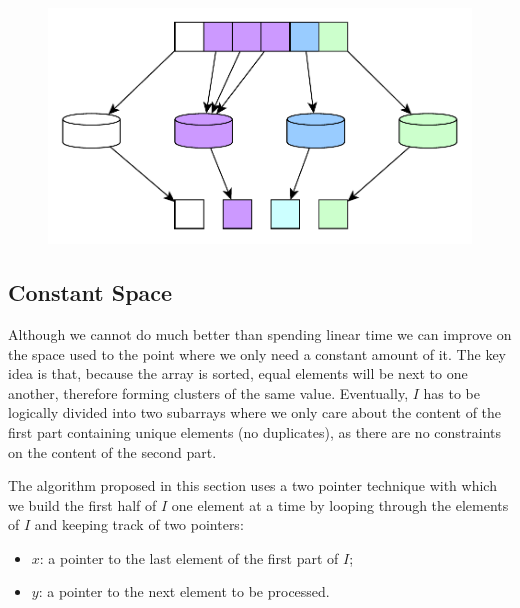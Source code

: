 \begin{figure} 
	\centering
   \includegraphics[width=\textwidth]{sources/remove_duplicated_sorted_array_inplace/images/intro}
   \caption[]{}
   \label{fig:remove_duplicated_sorted_array_inplace:example1} 
\end{figure}



\subsection{Constant Space}
\label{sec:remove_duplicated_sorted_array_inplace:constant_space}

Although we cannot do much better than spending linear time we can improve on the space used to the point where we only need a constant amount of it.
The key idea is that, because the array is sorted, equal elements will be next
to one another, therefore forming clusters of the same value. 
Eventually, $I$ has to be logically divided into
two subarrays where we only care about the content of the first part containing unique elements (no duplicates), as
there are no constraints on the content of the second part.

The algorithm proposed in this section uses a two pointer technique with which we
build the first half of $I$ one element at a time by looping through the
elements of $I$ and keeping track of two pointers:

\begin{itemize}
	\item $x$: a pointer to the last element of the first part of $I$;
	\item $y$: a pointer to the next element to be processed.
\end{itemize}

